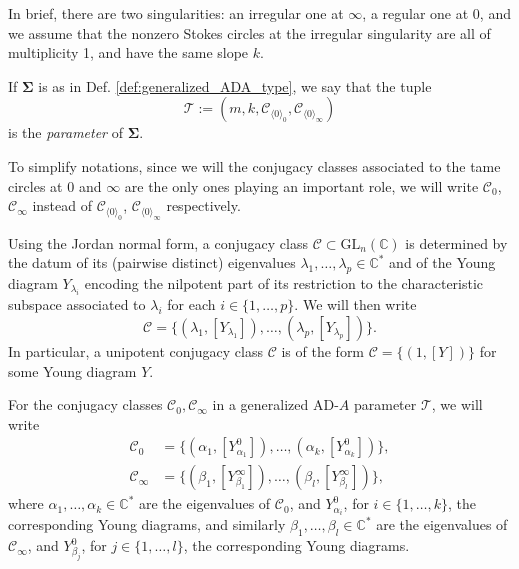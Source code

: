 \documentclass[11pt,a4paper]{amsart}
\numberwithin{equation}{section}
\newcommand{\cir}[1]{\langle #1 \rangle}
\begin{document}
In brief, there are two singularities: an irregular one at $\infty$, a regular one at $0$, and we assume that the nonzero Stokes circles at the irregular singularity are all of multiplicity 1, and have the same slope $k$.


\begin{definition}
If $\bm\Sigma$ is as in Def. \ref{def:generalized_ADA_type}, we say that the tuple
\begin{equation}
\mathcal T:=(m,k, \mathcal C_{\cir{0}_0},\mathcal C_{\cir{0}_\infty})
\end{equation}
is the \emph{parameter} of $\bm\Sigma$.
\end{definition}

\begin{notation}
To simplify notations, since we will the conjugacy classes associated to the tame circles at $0$ and $\infty$ are the only ones playing an important role, we will write $\mathcal C_0$, $\mathcal C_\infty$ instead of $\mathcal C_{\cir{0}_0}$, $\mathcal C_{\cir{0}_\infty}$ respectively.
\end{notation}

\begin{notation}
Using the Jordan normal form, a conjugacy class $\mathcal C\subset\mathrm{GL}_n(\mathbb C)$ is determined by the datum of its (pairwise distinct) eigenvalues $\lambda_1, \dots, \lambda_p\in \mathbb C^*$ and of the Young diagram $Y_{\lambda_i}$ encoding the nilpotent part of its restriction to the characteristic subspace associated to $\lambda_i$ for each $i\in \{1, \dots, p\}$. We will then write
\[
\mathcal C=\{(\lambda_1, [Y_{\lambda_1}]), \dots, (\lambda_p, [Y_{\lambda_p}])\}.
\]
In particular, a unipotent conjugacy class $\mathcal C$ is of the form $\mathcal C=\{(1,[Y])\}$ for some Young diagram $Y$.

For the conjugacy classes $\mathcal C_0, \mathcal C_\infty$ in a generalized AD-$A$ parameter $\mathcal T$, we will write
\begin{align*}
\mathcal C_0&=\{(\alpha_1, [Y^0_{\alpha_1}]), \dots, (\alpha_k,[Y^0_{\alpha_k}])\},\\
\mathcal C_\infty&=\{(\beta_1, [Y^{\infty}_{\beta_1}]), \dots, (\beta_l,[Y^{\infty}_{\beta_l}])\},
\end{align*}
where $\alpha_1, \dots, \alpha_k\in \mathbb C^*$ are the eigenvalues of $\mathcal C_0$, and $Y^0_{\alpha_i}$, for $i\in\{1, \dots, k\}$, the corresponding Young diagrams, and similarly $\beta_1, \dots, \beta_l\in \mathbb C^*$ are the eigenvalues of $\mathcal C_\infty$, and $Y^0_{\beta_j}$, for $j\in\{1, \dots, l\}$, the corresponding Young diagrams.
\end{notation}
\end{document}
